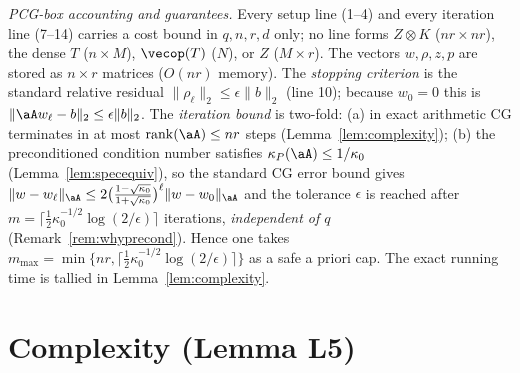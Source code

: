\noindent
\emph{PCG-box accounting and guarantees.} Every setup line (1--4) and every
iteration line (7--14) carries a cost bound in $q,n,r,d$ only; no line forms
$Z\otimes K$ ($nr\times nr$), the dense $T$ ($n\times M$), $\vecop(T)$ ($N$), or
$Z$ ($M\times r$). The vectors $w,\rho,z,p$ are stored as $n\times r$ matrices
($O(nr)$ memory). The \emph{stopping criterion} is the standard relative
residual $\|\rho_\ell\|_2\le\epsilon\|b\|_2$ (line 10); because $w_0=0$ this is
$\|\aA w_\ell-b\|_2\le\epsilon\|b\|_2$. The \emph{iteration bound} is two-fold:
(a) in exact arithmetic CG terminates in at most $\operatorname{rank}(\aA)\le nr$
steps (Lemma~\ref{lem:complexity}); (b) the preconditioned condition number
satisfies $\kappa_P(\aA)\le1/\kappa_0$ (Lemma~\ref{lem:specequiv}), so the
standard CG error bound gives
$\|w-w_\ell\|_{\aA}\le2\bigl(\tfrac{1-\sqrt{\kappa_0}}{1+\sqrt{\kappa_0}}\bigr)^{\ell}\|w-w_0\|_{\aA}$
and the tolerance $\epsilon$ is reached after
$m=\bigl\lceil\tfrac12\kappa_0^{-1/2}\log(2/\epsilon)\bigr\rceil$ iterations,
\emph{independent of $q$} (Remark~\ref{rem:whyprecond}). Hence one takes
$m_{\max}=\min\{nr,\lceil\tfrac12\kappa_0^{-1/2}\log(2/\epsilon)\rceil\}$ as a
safe a priori cap. The exact running time is tallied in
Lemma~\ref{lem:complexity}.

\section*{Complexity (Lemma L5)}

